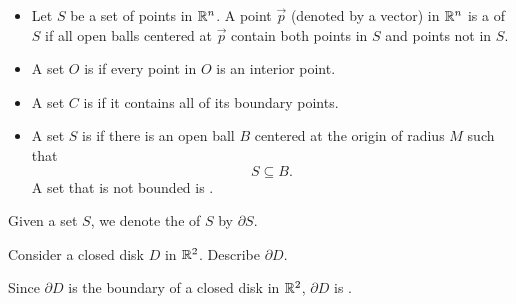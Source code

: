 \documentclass{ximera}
\begin{document}
\begin{definition}
\begin{itemize}
  \item Let $S$ be a set of points in $\mathbb R^n$. A point $\vec{p}$ (denoted by a vector) in $\mathbb R^n$ is
    a  of $S$ if all open balls centered at $\vec{p}$
    contain both points in $S$ and points not in $S$.
    \begin{image}
  \end{image}
  \item A set $O$ is  if every point in $O$ is an interior
    point.
    \begin{image}
    \end{image}
  \item A set $C$ is  if it contains all of its boundary
    points.
    \begin{image}
    \end{image}
  \item A set $S$ is  if there is an open ball $B$
    centered at the origin of radius $M$ such that
    \[
    S\subseteq B.
    \]
    A set that is not bounded is .
  \end{itemize}
  \item Given a set $S$, we denote the  of $S$ by
    $\partial S$.
\end{definition}


\begin{example}
  Consider a closed disk $D$ in $\mathbb R^2$. Describe $\partial D$.%
  \begin{explanation}
    Since $\partial D$ is the boundary of a closed disk in $\mathbb R^2$, $\partial D$ is .
  \end{explanation}
\end{example}
\end{document}

